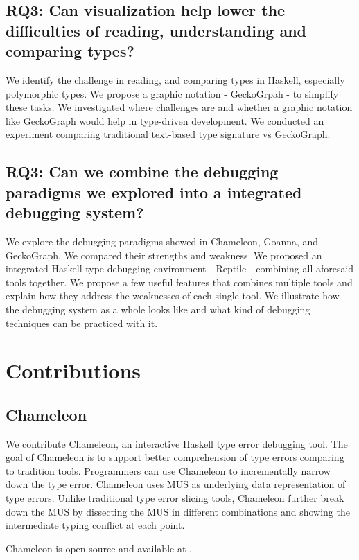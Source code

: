 \subsection{RQ3: Can visualization help lower the difficulties of reading, understanding and comparing types?}

We identify the challenge in reading, and comparing types in Haskell, especially polymorphic types. We propose a graphic notation - GeckoGrpah - to simplify these tasks. We investigated where challenges are and whether a graphic notation like GeckoGraph would help in type-driven development. We conducted an experiment comparing traditional text-based type signature vs GeckoGraph. 

\subsection{RQ3: Can we combine the debugging paradigms we explored into a integrated debugging system?}

We explore the debugging paradigms showed in Chameleon, Goanna, and GeckoGraph. We compared their strengths and weakness. We proposed an integrated Haskell type debugging environment - Reptile - combining all aforesaid tools together. We propose a few useful features that combines multiple tools and explain how they address the weaknesses of each single tool. We illustrate how the debugging system as a whole looks like and what kind of debugging techniques can be practiced with it. 

\section{Contributions}  \label{sec:contributions}

\subsection{Chameleon}
We contribute Chameleon, an interactive Haskell type error debugging tool. The goal of Chameleon is to support better comprehension of type errors comparing to tradition tools.  Programmers can use Chameleon to incrementally narrow down the type error. Chameleon uses MUS as underlying data representation of type errors. Unlike traditional type error slicing tools, Chameleon further break down the MUS by dissecting the MUS in different combinations and showing the intermediate typing conflict at each point.


Chameleon is open-source and available at \cite{fu_chameleonide_2023}. 

